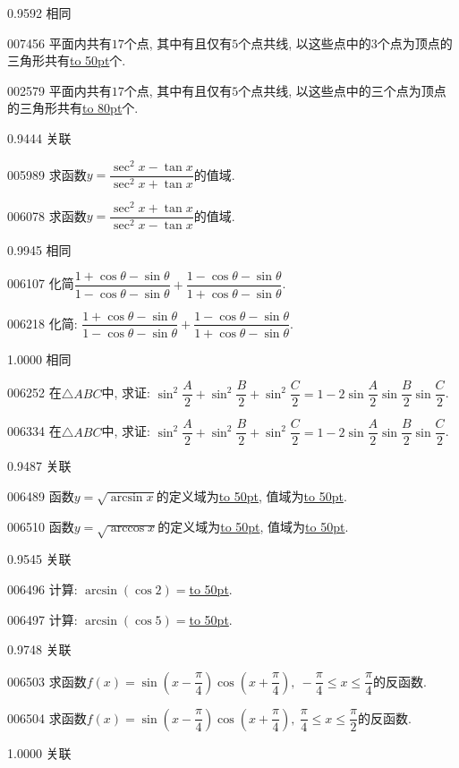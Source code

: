 \documentclass[10pt,a4paper]{article}
\newcommand{\blank}[1]{\underline{\hbox to #1pt{}}}
\begin{document}
0.9592 相同

007456	平面内共有$17$个点, 其中有且仅有$5$个点共线, 以这些点中的$3$个点为顶点的三角形共有\blank{50}个.

002579	平面内共有$17$个点, 其中有且仅有$5$个点共线, 以这些点中的三个点为顶点的三角形共有\blank{80}个.



0.9444 关联

005989	求函数$y=\dfrac{\sec ^2x-\tan x}{\sec ^2x+\tan x}$的值域.

006078	求函数$y=\dfrac{\sec ^2x+\tan x}{\sec ^2x-\tan x}$的值域.



0.9945 相同

006107	化简$\dfrac{1+\cos \theta -\sin \theta}{1-\cos \theta -\sin \theta}+\dfrac{1-\cos \theta -\sin \theta}{1+\cos \theta -\sin \theta}$.

006218	化简: $\dfrac{1+\cos \theta -\sin \theta}{1-\cos \theta -\sin \theta}+\dfrac{1-\cos \theta -\sin \theta}{1+\cos \theta -\sin \theta}$.



1.0000 相同

006252	在$\triangle ABC$中, 求证: $\sin ^2\dfrac A2+\sin ^2\dfrac B2+\sin ^2\dfrac C2=1-2\sin \dfrac A2\sin \dfrac B2\sin \dfrac C2$.

006334	在$\triangle ABC$中, 求证: $\sin ^2\dfrac A2+\sin ^2\dfrac B2+\sin ^2\dfrac C2=1-2\sin \dfrac A2\sin \dfrac B2\sin \dfrac C2$.



0.9487 关联

006489	函数$y=\sqrt {\arcsin x}$的定义域为\blank{50}, 值域为\blank{50}.

006510	函数$y=\sqrt {\arccos x}$的定义域为\blank{50}, 值域为\blank{50}.



0.9545 关联

006496	计算: $\arcsin (\cos 2)=$\blank{50}.

006497	计算: $\arcsin (\cos 5)=$\blank{50}.



0.9748 关联

006503	求函数$f(x)=\sin (x-\dfrac{\pi }4)\cos (x+\dfrac{\pi }4), \ -\dfrac{\pi }4\le x\le \dfrac{\pi }4$的反函数.

006504	求函数$f(x)=\sin (x-\dfrac{\pi }4)\cos (x+\dfrac{\pi }4),\  \dfrac{\pi }4\le x\le \dfrac{\pi }2$的反函数.



1.0000 关联
\end{document}
